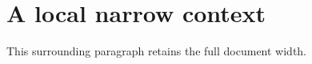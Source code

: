 \documentclass{article}
\begin{document}
\section*{A local narrow context}
\noindent\begin{minipage}{.55\linewidth}

\end{minipage}
\par\medskip
This surrounding paragraph retains the full document width.
\end{document}
